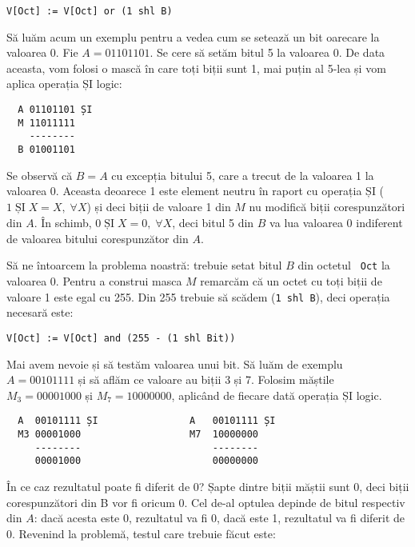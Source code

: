 \begin{verbatim}
V[Oct] := V[Oct] or (1 shl B)
\end{verbatim}

Să luăm acum un exemplu pentru a vedea cum se setează un bit oarecare la
valoarea 0. Fie $A = 01101101$. Se cere să setăm bitul 5 la valoarea 0. De
data aceasta, vom folosi o mască în care toți biții sunt 1, mai puțin al 5-lea
și vom aplica operația ȘI logic:

\begin{verbatim}
  A 01101101 ȘI
  M 11011111
    --------
  B 01001101
\end{verbatim}

Se observă că $B = A$ cu excepția bitului 5, care a trecut de la valoarea 1 la
valoarea 0. Aceasta deoarece 1 este element neutru în raport cu operația ȘI
($1\; \mathrm{\text{ȘI}}\; X = X,\; \forall X$) și deci biții de valoare 1 din
$M$ nu modifică biții corespunzători din $A$. În schimb, $0\;
\mathrm{\text{ȘI}}\; X = 0,\; \forall X$, deci bitul 5 din $B$ va lua valoarea
0 indiferent de valoarea bitului corespunzător din $A$.

Să ne întoarcem la problema noastră: trebuie setat bitul $B$ din octetul {\tt
  Oct} la valoarea 0. Pentru a construi masca $M$ remarcăm că un octet cu toți
biții de valoare 1 este egal cu 255. Din 255 trebuie să scădem ({\tt 1 shl
  B}), deci operația necesară este:

\begin{verbatim}
V[Oct] := V[Oct] and (255 - (1 shl Bit))
\end{verbatim}

Mai avem nevoie și să testăm valoarea unui bit. Să luăm de exemplu $A =
00101111$ și să aflăm ce valoare au biții 3 și 7. Folosim măștile $M_3 =
00001000$ și $M_7 = 10000000$, aplicând de fiecare dată operația ȘI logic.

\begin{verbatim}
  A  00101111 ȘI                A   00101111 ȘI
  M3 00001000                   M7  10000000
     --------                       --------
     00001000                       00000000  
\end{verbatim}

În ce caz rezultatul poate fi diferit de 0? Șapte dintre biții măștii sunt 0,
deci biții corespunzători din B vor fi oricum 0. Cel de-al optulea depinde de
bitul respectiv din $A$: dacă acesta este 0, rezultatul va fi 0, dacă este 1,
rezultatul va fi diferit de 0. Revenind la problemă, testul care trebuie făcut
este:

